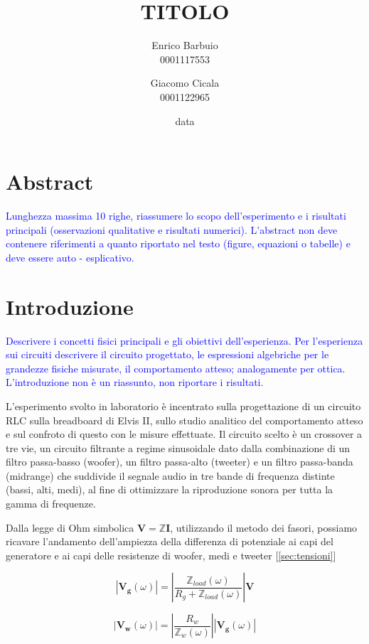 \documentclass[12pt,italian]{article}
\title{TITOLO}
\author{Enrico Barbuio \\ 0001117553 \and Giacomo Cicala \\ 0001122965}
\date{data}
\newcommand{\prof}[1]{\textcolor{blue}{#1}}
\begin{document}
\maketitle
\section*{Abstract}
\prof{ Lunghezza massima 10 righe, riassumere lo scopo dell'esperimento e i
  risultati principali (osservazioni qualitative e risultati numerici).
  L'abstract non deve contenere riferimenti a quanto riportato nel testo
  (figure, equazioni o tabelle) e deve essere auto - esplicativo. }

\section*{Introduzione}
\prof{ Descrivere i concetti fisici principali e gli obiettivi dell'esperienza.
  Per l'esperienza sui circuiti descrivere il circuito progettato, le
  espressioni algebriche per le grandezze fisiche misurate, il comportamento
  atteso; analogamente per ottica. L'introduzione non è un riassunto, non
  riportare i risultati.}

L'esperimento svolto in laboratorio è incentrato sulla progettazione di un
circuito RLC sulla breadboard di Elvis II, sullo studio analitico del
comportamento atteso e sul confroto di questo con le misure effettuate. Il
circuito scelto è un crossover a tre vie, un circuito filtrante a regime
sinusoidale dato dalla combinazione di un filtro passa-basso (woofer), un
filtro passa-alto (tweeter) e un filtro passa-banda (midrange) che suddivide il
segnale audio in tre bande di frequenza distinte (bassi, alti, medi), al fine
di ottimizzare la riproduzione sonora per tutta la gamma di frequenze.

Dalla legge di Ohm simbolica $\textbf{V} = \mathbb{Z} \textbf{I}$, utilizzando
il metodo dei fasori, possiamo ricavare l'andamento dell'ampiezza della
differenza di potenziale ai capi del generatore e ai capi delle resistenze di
woofer, medi e tweeter [\ref{sec:tensioni}]%

\begin{equation}
  \left| \mathbf{V_{g}}(\omega) \right| = \left| \frac{\mathbb{Z}_{load}(\omega)}
  {R_{g}+\mathbb{Z}_{load}(\omega)}\right| \mathbf{V}
  \label{eq:Vg}
\end{equation}

\begin{equation}
  \left| \mathbf{V_{w}}(\omega) \right| = \left| \frac{R_{w}}
  {\mathbb{Z}_{w}(\omega)}\right|\left| \mathbf{V_{g}}(\omega) \right|
  \label{eq:Vw}
\end{equation}
\end{document}
